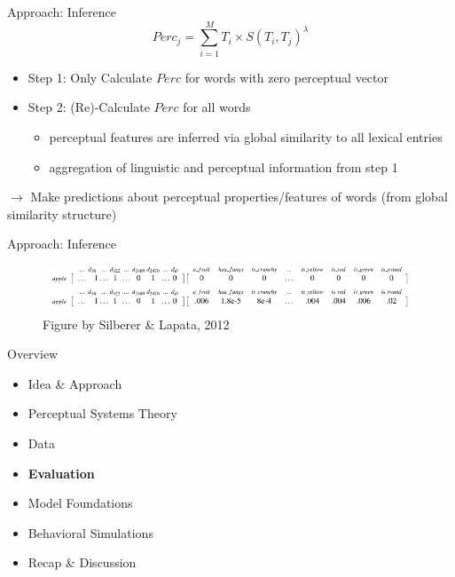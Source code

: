 \documentclass[12pt,a4paper]{beamer}
\begin{document}
\begin{frame}{Approach: Inference}
$$ Perc_{j} = \sum_{i=1}^{M}{T_{i} \times S(T_{i}, T_{j})^{\lambda} } $$
\begin{itemize}
\item Step 1: Only Calculate $Perc$ for words with zero perceptual vector
\item Step 2: (Re)-Calculate $Perc$ for all words
    \begin{itemize}
    \item perceptual features are inferred via global similarity to all lexical entries
    \item aggregation of linguistic and perceptual information from step 1
    \end{itemize}
\end{itemize}
$\to$ Make predictions about perceptual properties/features of words (from global similarity structure)
\end{frame}

\begin{frame}{Approach: Inference}
\begin{figure}
\includegraphics[width=\textwidth]{silber_lapata_example_lexical_representation_and_inference_figure_3.png}
\caption{Figure by Silberer \& Lapata, 2012 \cite{silberer}}
\end{figure}
\end{frame}


\begin{frame}{Overview}
\begin{itemize}
\item Idea \& Approach 
\item Perceptual Systems Theory
\item Data
\item \textbf{Evaluation}
    \item Model Foundations
    \item Behavioral Simulations
\item Recap \& Discussion
\end{itemize}
\end{frame}
\end{document}
